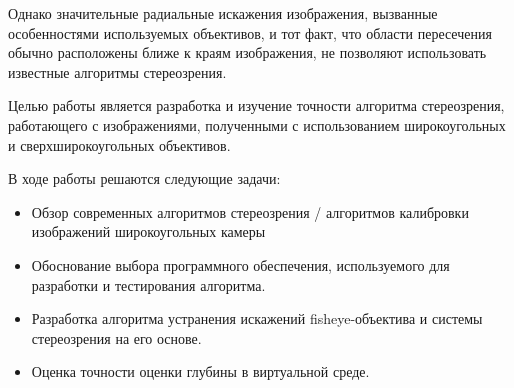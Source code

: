 Однако значительные радиальные искажения изображения, вызванные особенностями используемых объективов, и тот факт, что области пересечения 
обычно расположены ближе к краям изображения, не позволяют использовать известные алгоритмы стереозрения. %

Целью работы является разработка и изучение точности алгоритма стереозрения, работающего с изображениями, полученными с использованием
широкоугольных и сверхширокоугольных объективов. 

В ходе работы решаются следующие задачи:
\begin{itemize}
    \item Обзор современных алгоритмов стереозрения / алгоритмов калибровки изображений широкоугольных камеры
    \item Обоснование выбора программного обеспечения, используемого для разработки и тестирования алгоритма. 
    \item Разработка алгоритма устранения искажений fisheye-объектива и системы стереозрения на его основе.   %
    \item Оценка точности оценки глубины в виртуальной среде.  
\end{itemize}
